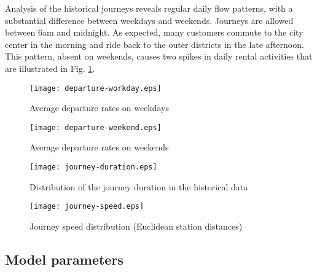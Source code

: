 \documentclass{article}
\begin{document}
Analysis of the historical journeys reveals regular daily flow patterns, with a
substantial difference between weekdays and weekends. Journeys are allowed
between 6am and midnight. As expected, many customers commute to the city center
in the morning and ride back to the outer districts in the late afternoon. This
pattern, absent on weekends, causes two spikes in daily rental activities that
are illustrated in Fig. \ref{fig:daily-rides}.
\begin{subfigures}
  \begin{figure}
    \begin{minipage}[h]{.475\linewidth}
      \centering
      \texttt{[image: departure-workday.eps]}
      \caption{Average departure rates on weekdays}
      \label{fig:rides-workday}
    \end{minipage}
    \hfill
    \begin{minipage}[h]{.475\linewidth}
      \centering
      \texttt{[image: departure-weekend.eps]}
      \caption{Average departure rates on weekends}
      \label{fig:rides-weekend}
    \end{minipage}
    \label{fig:daily-rides}
  \end{figure}
\end{subfigures}

\begin{subfigures}
  \begin{figure}
    \begin{minipage}[h]{.475\linewidth}
      \centering
      \texttt{[image: journey-duration.eps]}
      \caption{Distribution of the journey duration in the historical data}
      \label{fig:journey-duration}
    \end{minipage}
    \hfill
    \begin{minipage}[h]{.475\linewidth}
      \centering
      \texttt{[image: journey-speed.eps]}
      \caption{Journey speed distribution (Euclidean station distances)}
\label{fig:journey-speed}
    \end{minipage}
    \label{fig:journey-figures}
  \end{figure}
\end{subfigures}

\subsection{Model parameters}
\end{document}
